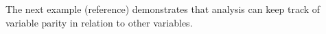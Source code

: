The next example (reference) demonstrates that analysis can keep track of variable parity in relation to other variables. 